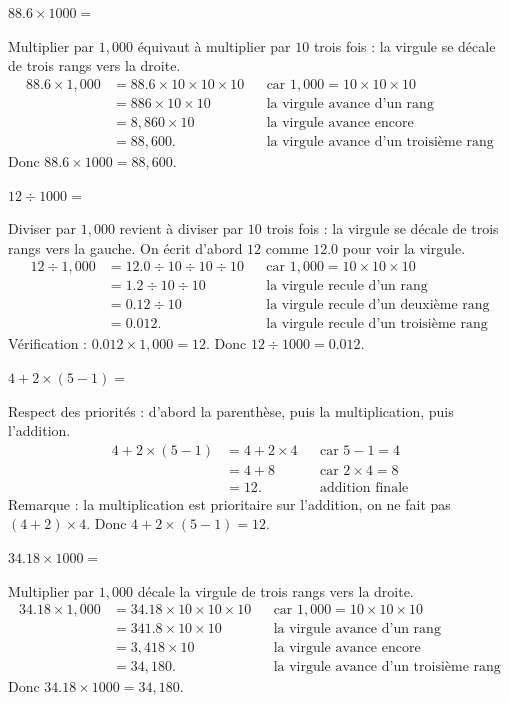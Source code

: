 \documentclass[answers]{exam}
\begin{document}
\begin{questions}
\question $88.6 \times 1000 =$
\begin{solution}
Multiplier par $1,000$ équivaut à multiplier par $10$ trois fois : la virgule se décale de trois rangs vers la droite.
\begin{align*}
88.6 \times 1,000
&= 88.6 \times 10 \times 10 \times 10 &&\text{car }1,000=10\times10\times10 \\
&= 886 \times 10 \times 10 &&\text{la virgule avance d'un rang} \\
&= 8,860 \times 10 &&\text{la virgule avance encore} \\
&= 88,600. &&\text{la virgule avance d'un troisième rang}
\end{align*}
Donc $88.6 \times 1000 = 88,600$.
\end{solution}

\question $12 \div 1000 =$
\begin{solution}
Diviser par $1,000$ revient à diviser par $10$ trois fois : la virgule se décale de trois rangs vers la gauche. On écrit d'abord $12$ comme $12.0$ pour voir la virgule.
\begin{align*}
12 \div 1,000
&= 12.0 \div 10 \div 10 \div 10 &&\text{car }1,000=10\times10\times10 \\
&= 1.2 \div 10 \div 10 &&\text{la virgule recule d'un rang} \\
&= 0.12 \div 10 &&\text{la virgule recule d'un deuxième rang} \\
&= 0.012. &&\text{la virgule recule d'un troisième rang}
\end{align*}
Vérification : $0.012 \times 1,000 = 12$.
Donc $12 \div 1000 = 0.012$.
\end{solution}

\question $4 + 2 \times (5 - 1) =$
\begin{solution}
Respect des priorités : d'abord la parenthèse, puis la multiplication, puis l'addition.
\begin{align*}
4 + 2 \times (5 - 1)
&= 4 + 2 \times 4 &&\text{car }5 - 1 = 4 \\
&= 4 + 8 &&\text{car }2 \times 4 = 8 \\
&= 12. &&\text{addition finale}
\end{align*}
Remarque : la multiplication est prioritaire sur l'addition, on ne fait pas $(4+2)\times4$.
Donc $4 + 2 \times (5 - 1) = 12$.
\end{solution}

\question $34.18 \times 1000 =$
\begin{solution}
Multiplier par $1,000$ décale la virgule de trois rangs vers la droite.
\begin{align*}
34.18 \times 1,000
&= 34.18 \times 10 \times 10 \times 10 &&\text{car }1,000=10\times10\times10 \\
&= 341.8 \times 10 \times 10 &&\text{la virgule avance d'un rang} \\
&= 3,418 \times 10 &&\text{la virgule avance encore} \\
&= 34,180. &&\text{la virgule avance d'un troisième rang}
\end{align*}
Donc $34.18 \times 1000 = 34,180$.
\end{solution}


\end{questions}
\end{document}
